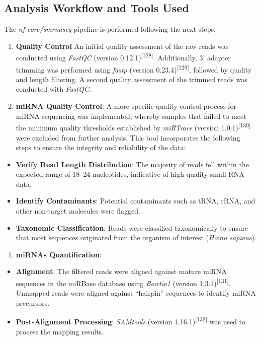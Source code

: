 \documentclass[
  11pt,
  letterpaper,
]{book}
\providecommand{\tightlist}{%
  \setlength{\itemsep}{0pt}\setlength{\parskip}{0pt}}\usepackage{longtable,booktabs,array}
\begin{document}
\subsection{Analysis Workflow and Tools
Used}\label{analysis-workflow-and-tools-used}

The \emph{nf-core/smrnaseq} pipeline is performed following the next
steps:

\begin{enumerate}
\def\labelenumi{\arabic{enumi}.}
\item
  \textbf{Quality Control} An initial quality assessment of the raw
  reads was conducted using \emph{FastQC} (version
  0.12.1)\textsuperscript{{[}128{]}}. Additionally, 3' adapter trimming
  was performed using \emph{fastp} (version
  0.23.4)\textsuperscript{{[}129{]}}, followed by quality and length
  filtering. A second quality assessment of the trimmed reads was
  conducted with \emph{FastQC}.
\item
  \textbf{miRNA Quality Control}: A more specific quality control
  process for miRNA sequencing was implemented, whereby samples that
  failed to meet the minimum quality thresholds established by
  \emph{miRTrace} (version 1.0.1)\textsuperscript{{[}130{]}} were
  excluded from further analysis. This tool incorporates the following
  steps to ensure the integrity and reliability of the data:
\end{enumerate}

\begin{itemize}
\tightlist
\item
  \textbf{Verify Read Length Distribution}: The majority of reads fell
  within the expected range of 18--24 nucleotides, indicative of
  high-quality small RNA data.
\item
  \textbf{Identify Contaminants}: Potential contaminants such as tRNA,
  rRNA, and other non-target molecules were flagged.
\item
  \textbf{Taxonomic Classification}: Reads were classified taxonomically
  to ensure that most sequences originated from the organism of interest
  (\emph{Homo sapiens}).
\end{itemize}

\begin{enumerate}
\def\labelenumi{\arabic{enumi}.}
\setcounter{enumi}{2}
\tightlist
\item
  \textbf{miRNAs Quantification}:
\end{enumerate}

\begin{itemize}
\tightlist
\item
  \textbf{Alignment}: The filtered reads were aligned against mature
  miRNA sequences in the miRBase database using \emph{Bowtie1} (version
  1.3.1)\textsuperscript{{[}131{]}}. Unmapped reads were aligned against
  ``hairpin'' sequences to identify miRNA precursors.
\item
  \textbf{Post-Alignment Processing}: \emph{SAMtools} (version
  1.16.1)\textsuperscript{{[}132{]}} was used to process the mapping
  results.
\end{itemize}
\end{document}
